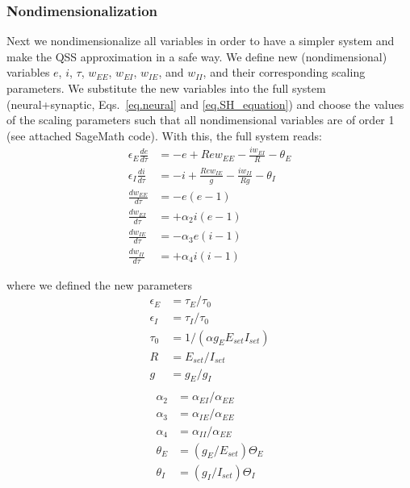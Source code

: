 \documentclass[
twocolumn,
]{article}
\newcommand{\EE}{\mathit{EE}}
\newcommand{\EI}{\mathit{EI}}
\newcommand{\IE}{\mathit{IE}}
\newcommand{\II}{\mathit{II}}
\newcommand{\set}{\mathit{set}}
\begin{document}
\subsubsection{Nondimensionalization}

Next we nondimensionalize all variables in order to have a simpler system and make the QSS approximation in a safe way. We define new (nondimensional) variables $e$, $i$, $\tau$, $w_{\EE}$, $w_{\EI}$, $w_{\IE}$, and $w_{\II}$, and their corresponding scaling parameters. We substitute the new variables into the full system (neural+synaptic, Eqs.\ \ref{eq.neural} and \ref{eq.SH_equation}) and choose the values of the scaling parameters such that all nondimensional variables are of order 1 (see attached SageMath code). With this, the full system reads:
\begin{equation}
\begin{aligned}
\epsilon_E \frac{de}{d\tau} & = -e + R e w_{\EE} - \frac{i w_{\EI}}{R} - \theta_E \\
\epsilon_I \frac{di}{d\tau} & = -i + \frac{R e w_{\IE}}{g} - \frac{i w_{\II}}{Rg} - \theta_I \\
\frac{dw_{\EE}}{d\tau} & = -e(e-1) \\
\frac{dw_{\EI}}{d\tau} & = +\alpha_2 i(e-1) \\
\frac{dw_{\IE}}{d\tau} & = -\alpha_3 e(i-1) \\
\frac{dw_{\II}}{d\tau} & = +\alpha_4 i(i-1)
\end{aligned}
\label{eq.SH_full_norm}
\end{equation}

\noindent where we defined the new parameters
\begin{displaymath}
\begin{aligned}
\epsilon_E & = \tau_E/\tau_0 \\
\epsilon_I & = \tau_I/\tau_0 \\
\tau_0 & = 1/(\alpha g_E E_{\set} I_{\set}) \\
R & = E_{\set}/I_{\set} \\
g & = g_E/g_I \\
\end{aligned}
\end{displaymath}
\begin{displaymath}
\begin{aligned}
\alpha_2 & = \alpha_{\EI}/\alpha_{\EE} \\
\alpha_3 & = \alpha_{\IE}/\alpha_{\EE} \\
\alpha_4 & = \alpha_{\II}/\alpha_{\EE} \\
\theta_E & = (g_E/E_{\set}) \Theta_E \\
\theta_I & = (g_I/I_{\set}) \Theta_I
\end{aligned}
\end{displaymath}
\end{document}
